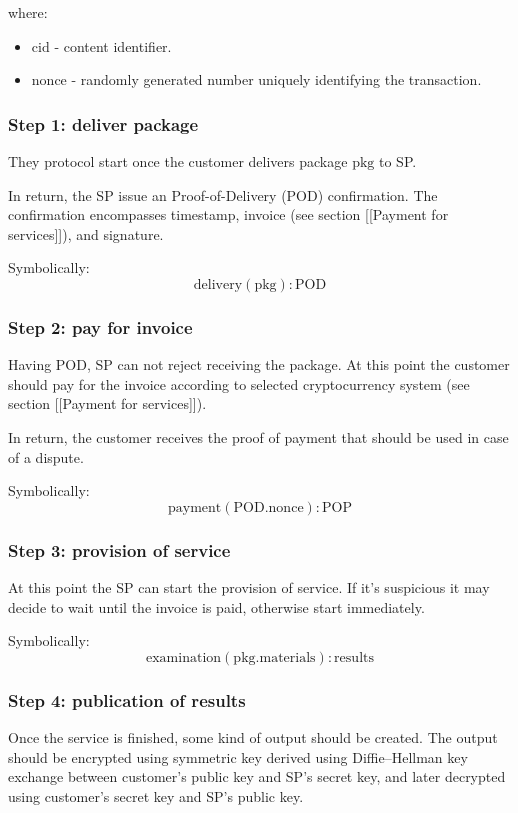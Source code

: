 \documentclass{article}
\begin{document}
where:
\begin{itemize}
    \item $\mathrm{cid}$ - content identifier.
    \item $\mathrm{nonce}$ - randomly generated number uniquely identifying the transaction.
\end{itemize}

\subsubsection{Step 1: deliver package}

They protocol start once the customer delivers package $\mathrm{pkg}$ to SP.

In return, the SP issue an Proof-of-Delivery (POD) confirmation. The confirmation encompasses timestamp, invoice (see section [[Payment for services]]), and signature. 

Symbolically:
$$
\mathrm{delivery}(\mathrm{pkg}) : \mathrm{POD}
$$


\subsubsection{Step 2: pay for invoice}
Having POD, SP can not reject receiving the package. At this point the customer should pay for the invoice according to selected cryptocurrency system (see section [[Payment for services]]). 

In return, the customer receives the proof of payment that should be used in case of a dispute.

Symbolically:
$$
\mathrm{payment}(\mathrm{POD}.\mathrm{nonce}) : \mathrm{POP}
$$

\subsubsection{Step 3: provision of service}
At this point the SP can start the provision of service. If it's suspicious it may decide to wait until the invoice is paid, otherwise start immediately.

Symbolically:
$$
\mathrm{examination}(\mathrm{pkg}.\mathrm{materials}) : \mathrm{results}
$$

\subsubsection{Step 4: publication of results}
Once the service is finished, some kind of output should be created. The output should be encrypted using symmetric key derived using Diffie–Hellman key exchange between customer's public key and SP's secret key, and later decrypted using customer's secret key and SP's public key. 
\end{document}

